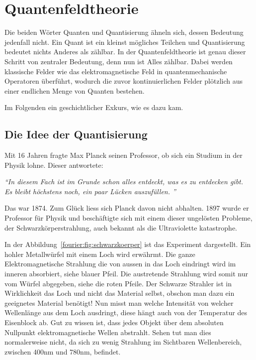 %
%
%
%
\section{Quantenfeldtheorie\label{fourier:section:quantenfeldtheorie}}
Die beiden Wörter Quanten und Quantisierung ähneln sich, dessen Bedeutung jedenfall nicht. 
Ein Quant ist ein kleinst mögliches Teilchen und Quantisierung bedeutet nichts Anderes als zählbar. 
In der Quantenfeldtheorie ist genau dieser Schritt von zentraler Bedeutung, denn nun ist Alles zählbar. 
Dabei werden klassische Felder wie das elektromagnetische Feld in quantenmechanische Operatoren überführt, wodurch die zuvor kontinuierlichen Felder plötzlich aus einer endlichen Menge von Quanten bestehen.

Im Folgenden ein geschichtlicher Exkurs, wie es dazu kam. 



\subsection{Die Idee der Quantisierung\label{fourier:subsection:DieIdeeDerQuantisierung}}
	Mit 16 Jahren fragte Max Planck seinen Professor, ob sich ein Studium in der Physik lohne. 
	Dieser antwortete:
	
	\begin{center}
		\textit{``{}In diesem Fach ist im Grunde schon alles entdeckt, was es zu entdecken gibt.\\
			Es bleibt höchstens noch, ein paar Lücken auszufüllen. ''}
	\end{center}
	
	Das war 1874. 
	Zum Glück liess sich Planck davon nicht abhalten.
	1897 wurde er Professor für Physik und beschäftigte sich mit einem dieser ungelösten Probleme, der Schwarzkörperstrahlung, auch bekannt als die Ultraviolette katastrophe. 
	
	
	In der Abbildung~\ref{fourier:fig:schwarzkoerper} ist das Experiment dargestellt. Ein hohler Metallwürfel mit einem Loch wird erwährmt. Die ganze Elektromagnetische Strahlung die von aussen in das Loch eindringt wird im inneren absorbiert, siehe blauer Pfeil. Die austretende Strahlung wird somit nur vom Würfel abgegeben, siehe die roten Pfeile. Der Schwarze Strahler ist in Wirklichkeit das Loch und nicht das Material selbst, obschon man dazu ein geeignetes Material benötigt! Nun misst man welche Intensität von welcher Wellenlänge aus dem Loch ausdringt, diese hängt auch von der Temperatur des Eisenblock ab. 
	Gut zu wissen ist, dass jedes Objekt über dem absoluten Nullpunkt elektromagnetische Wellen abstrahlt. 
	Sehen tut man dies normalerweise nicht, da sich zu wenig Strahlung im Sichtbaren Wellenbereich, zwischen 400nm und 780nm,  befindet. 
	
